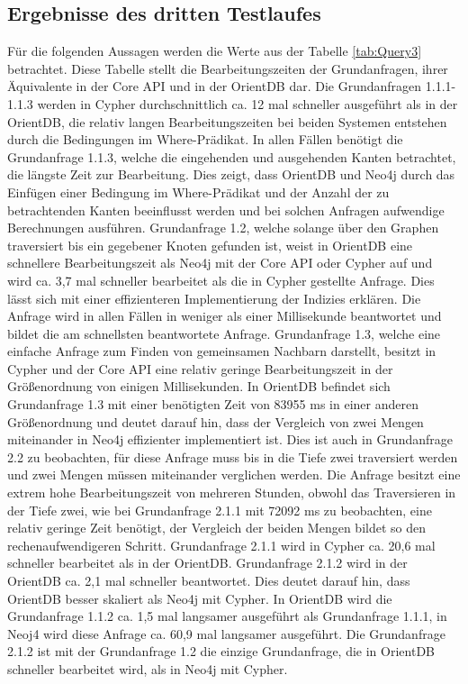 \subsection{Ergebnisse des dritten Testlaufes}
Für die folgenden Aussagen werden die Werte aus der Tabelle \ref{tab:Query3}  betrachtet. Diese Tabelle stellt die Bearbeitungszeiten der Grundanfragen, ihrer Äquivalente in der Core API und in der OrientDB dar. \newline
Die Grundanfragen 1.1.1-1.1.3 werden in Cypher durchschnittlich ca. 12 mal schneller ausgeführt als in der OrientDB, die relativ langen Bearbeitungszeiten bei beiden Systemen entstehen durch die Bedingungen im Where-Prädikat. In allen Fällen benötigt die Grundanfrage 1.1.3, welche die eingehenden und ausgehenden Kanten betrachtet, die längste Zeit zur Bearbeitung. Dies zeigt, dass OrientDB und Neo4j durch das Einfügen einer Bedingung im Where-Prädikat und der Anzahl der zu betrachtenden Kanten beeinflusst werden und bei solchen Anfragen aufwendige Berechnungen ausführen. \newline
 Grundanfrage 1.2, welche solange über den Graphen traversiert bis ein gegebener Knoten gefunden ist, weist in OrientDB eine schnellere Bearbeitungszeit als Neo4j mit der Core API oder Cypher auf und wird ca. 3,7 mal schneller bearbeitet als die in Cypher gestellte Anfrage. Dies lässt sich mit einer effizienteren Implementierung der Indizies erklären. Die Anfrage wird in allen Fällen in weniger als einer Millisekunde beantwortet und bildet die am schnellsten beantwortete Anfrage. \newline
Grundanfrage 1.3, welche eine einfache Anfrage zum Finden von gemeinsamen Nachbarn darstellt, besitzt in Cypher und der Core API eine relativ geringe Bearbeitungszeit in der Größenordnung von einigen Millisekunden. In OrientDB befindet sich Grundanfrage 1.3 mit einer benötigten Zeit von 83955 ms in einer anderen Größenordnung und deutet darauf hin, dass der Vergleich von zwei Mengen miteinander in Neo4j effizienter implementiert ist. Dies ist auch in Grundanfrage 2.2 zu beobachten, für diese Anfrage muss bis in die Tiefe zwei traversiert werden und zwei Mengen müssen miteinander verglichen werden. Die Anfrage besitzt eine extrem hohe Bearbeitungszeit von mehreren Stunden, obwohl das Traversieren in der Tiefe zwei, wie bei Grundanfrage 2.1.1 mit 72092 ms zu beobachten, eine relativ geringe Zeit benötigt, der Vergleich der beiden Mengen bildet so den rechenaufwendigeren Schritt. \newline
 Grundanfrage 2.1.1 wird in Cypher ca. 20,6 mal schneller bearbeitet als in der OrientDB. Grundanfrage 2.1.2 wird in der OrientDB ca. 2,1 mal schneller beantwortet. Dies deutet darauf hin, dass OrientDB besser skaliert als Neo4j mit Cypher. In OrientDB wird die Grundanfrage 1.1.2 ca. 1,5 mal langsamer ausgeführt als Grundanfrage 1.1.1, in Neoj4 wird diese Anfrage ca. 60,9 mal langsamer ausgeführt.   Die Grundanfrage 2.1.2 ist mit der Grundanfrage 1.2 die einzige Grundanfrage, die in OrientDB schneller bearbeitet wird, als in Neo4j mit Cypher. \newline  
